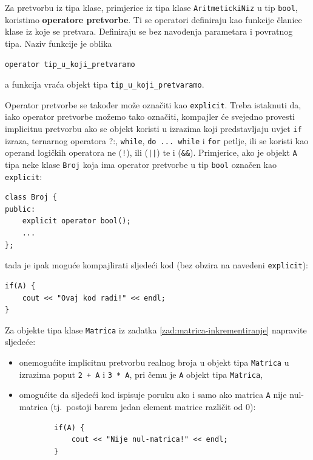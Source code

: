 Za pretvorbu iz tipa klase,
primjerice iz tipa klase \texttt{AritmetickiNiz} u tip \texttt{bool},
koristimo \textbf{operatore pretvorbe}.
Ti se operatori definiraju kao funkcije članice klase iz koje se pretvara.
Definiraju se bez navođenja parametara i povratnog tipa.
Naziv funkcije je oblika
\begin{center}
    \texttt{operator tip\_u\_koji\_pretvaramo}
\end{center}
a funkcija vraća objekt tipa \texttt{tip\_u\_koji\_pretvaramo}.
\medskip

Operator pretvorbe se također može označiti kao \texttt{explicit}.
Treba istaknuti da, iako operator pretvorbe možemo tako označiti, kompajler će 
svejedno provesti implicitnu pretvorbu ako se objekt koristi u izrazima koji predstavljaju uvjet
\texttt{if} izraza, ternarnog operatora {?:}, \texttt{while}, \texttt{do ... while} i \texttt{for} petlje,
ili se koristi kao operand logičkih operatora ne 
(\texttt{!}), ili (\texttt{||}) te i (\texttt{\&\&}).
Primjerice, ako je objekt \texttt{A} tipa neke klase \texttt{Broj} koja ima operator pretvorbe u tip \texttt{bool} označen kao \texttt{explicit}:
\begin{verbatim}
class Broj {
public:
    explicit operator bool();
    ...
};
\end{verbatim}
tada je ipak moguće kompajlirati sljedeći kod (bez obzira na navedeni \texttt{explicit}):
\begin{verbatim}
if(A) {
    cout << "Ovaj kod radi!" << endl;
}
\end{verbatim}


\begin{zadatak}
    Za objekte tipa klase \texttt{Matrica} iz zadatka \ref{zad:matrica-inkrementiranje}
    napravite sljedeće:
    \begin{itemize}
        \item[(a)]
        onemogućite implicitnu pretvorbu realnog broja u objekt tipa \texttt{Matrica} u izrazima poput \texttt{2\!\! +\!\! A} 
        i \texttt{3\!\! *\!\! A}, pri čemu je \texttt{A} objekt tipa \texttt{Matrica},
        \item[(b)]
        omogućite da sljedeći kod ispisuje poruku ako i samo ako matrica \texttt{A} nije nul-matrica
        (tj.\ postoji barem jedan element matrice različit od $0$):
        \begin{verbatim}
        if(A) {
            cout << "Nije nul-matrica!" << endl;
        }
        \end{verbatim}
    \end{itemize}
\end{zadatak}


